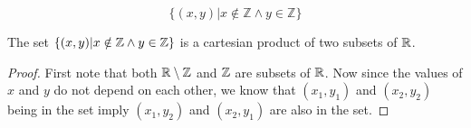 \documentclass[main.tex]{subfiles}
\begin{document}
\subproblem{}\label{10d}

\[\{(x, y) | x \notin \mathbb{Z} \land y \in \mathbb{Z}\}\]

\begin{thm}
	The set \(\{(x,y)|x \notin \mathbb{Z} \land y \in \mathbb{Z}\}\)
	is a cartesian product of two subsets of \(\mathbb{R}\).
\end{thm}
\begin{proof}
	First note that both \(\mathbb{R} \setminus \mathbb{Z}\) and \(\mathbb{Z}\) are
	subsets of \(\mathbb{R}\). Now since the values of \(x\) and \(y\) do not
	depend on each other, we know that \((x_1,y_1)\) and \((x_2,y_2)\) being
	in the set imply \((x_1,y_2)\) and \((x_2,y_1)\) are also in the set.
\end{proof}
\end{document}
